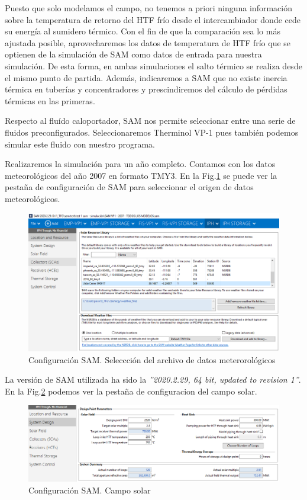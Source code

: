 Puesto que solo modelamos el campo, no tenemos a priori ninguna información sobre la temperatura de retorno del HTF frío desde el intercambiador donde cede su energía al sumidero térmico. Con el fin de que la comparación sea lo más ajustada posible, aprovecharemos los datos de temperatura de HTF frío que se optienen de la simulación de SAM como datos de entrada para nuestra simulación. De esta forma, en ambas simulaciones el salto térmico se realiza desde el mismo punto de partida. Además, indicaremos a SAM que no existe inercia térmica en tuberías y concentradores y prescindiremos del cálculo de pérdidas térmicas en las primeras.

Respecto al fluído caloportador, SAM nos permite seleccionar entre una serie de fluidos preconfigurados. Seleccionaremos Therminol VP-1 pues también podemos simular este fluido con nuestro programa.

Realizaremos la simulación para un año completo. Contamos con los datos meteorológicos del año 2007 en formato TMY3.  En la Fig.\ref{fig:captura01} se puede ver la pestaña de configuración de SAM para seleccionar el origen de datos meteorológicos.

\begin{figure}
\includegraphics[width=0.9\linewidth]{images/captura_sam_iph01.png}
\caption{Configuración SAM. Seleccción del archivo de datos meterorológicos} 
\label{fig:captura01}
\end{figure}


La versión de SAM utilizada ha sido la \emph{''2020.2.29, 64 bit, updated to revision 1''}. En la Fig.\ref{fig:captura02} podemos ver la pestaña de configuracion del campo solar. 

\begin{figure}
\includegraphics[width=0.9\linewidth]{images/captura_sam_iph02.png}
\caption{Configuración SAM. Campo solar} 
\label{fig:captura02}
\end{figure}

